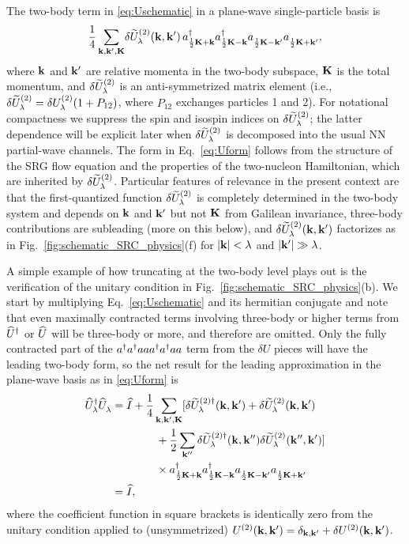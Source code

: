 \documentclass[10pt,aps,prc,floatfix,twocolumn,nofootinbib]{revtex4-1}
\begin{document}
The two-body term in \eqref{eq:Uschematic} in a plane-wave single-particle basis is
%
\begin{align} 
    \frac{1}{4} \sum_{\kvec,\kvec',\Kvec} \!  \delUtilde^{(2)}_\lambda(\kvec,\kvec') \,
    \akdag_{\frac{1}{2}\Kvec + \kvec} \akdag_{\frac{1}{2}\Kvec - \kvec} 
    \ak_{\frac{1}{2}\Kvec - \kvec'} \ak_{\frac{1}{2}\Kvec + \kvec'} 
    ,  \label{eq:Uform} 
\end{align}
%
where $\mathbf{k}$ and $\mathbf{k}'$ are relative momenta in the two-body subspace, $\mathbf{K}$ is the total momentum, and $\delta \widetilde U^{(2)}_\lambda$ is an anti-symmetrized matrix element (i.e., $\delta \widetilde U^{(2)}_\lambda = \delta U_\lambda^{(2)} (1 + P_{12})$, where $P_{12}$ exchanges particles 1 and 2). 
For notational compactness we suppress the spin and isospin indices on $\delta \widetilde U^{(2)}_\lambda$;
the latter dependence will be explicit later when $\delta \widetilde U^{(2)}_\lambda$ is decomposed into the usual NN partial-wave channels.
The form in Eq.~\eqref{eq:Uform} follows from the structure of the SRG flow equation and the properties of the two-nucleon Hamiltonian, which are inherited by $\delta \widetilde U^{(2)}_\lambda$.
Particular features of relevance in the present context are that  the first-quantized function $\delta \widetilde U^{(2)}_\lambda$ is completely determined in the two-body system and depends on $\mathbf{k}$ and $\mathbf{k}'$ but not $\mathbf{K}$ from Galilean invariance, three-body contributions are subleading (more on this below), and $\delta \widetilde U^{(2)}_\lambda(\mathbf{k},\mathbf{k}')$ factorizes as in Fig.~\ref{fig:schematic_SRC_physics}(f) for $|\mathbf{k}| < \lambda$ and $|\mathbf{k}'|\gg \lambda$.


A simple example of how truncating at the two-body level plays out is the verification of the  unitary condition in Fig.~\ref{fig:schematic_SRC_physics}(b).
We start by multiplying Eq.~\eqref{eq:Uschematic} and its hermitian conjugate and note that even maximally contracted terms involving three-body or higher terms from $\widehat U^\dagger$ or $\widehat U$ will be three-body or more, and therefore are omitted. 
Only the fully contracted part of the $a^{\dagger}a^{\dagger} a  aa^{\dagger}a^{\dagger} a a$ term from the $\delta U$ pieces will have the leading two-body form, so the net result for the leading approximation in the plane-wave basis as in \eqref{eq:Uform} is
%
\begin{align}
    \Uhatlamdag \Uhatlam &= \Ihat + \frac{1}{4}\sum_{\kvec,\kvec',\Kvec}
    [\delUtilde^{(2)\dagger}_\lambda(\kvec,\kvec') + \delUtilde^{(2)}_\lambda(\kvec,\kvec')
    \notag \\
    & \qquad\qquad \null + \frac{1}{2}\sum_{\kvec''} \delUtilde^{(2)\dagger}_\lambda(\kvec,\kvec'')\delUtilde^{(2)}_\lambda(\kvec'',\kvec') ]
    \notag \\
    & \qquad\qquad \null \times
     \akdag_{\frac{1}{2}\Kvec + \kvec} \akdag_{\frac{1}{2}\Kvec - \kvec} 
    \ak_{\frac{1}{2}\Kvec - \kvec'} \ak_{\frac{1}{2}\Kvec + \kvec'} 
    \notag \\
    &= \Ihat ,
    \label{eq:UdaggerU}
\end{align}
%
where the coefficient function in square brackets is identically zero from the unitary condition applied to (unsymmetrized) $U^{(2)}(\mathbf{k},\mathbf{k}') = \delta_{\mathbf{k},\mathbf{k}'} + \delta U^{(2)}(\mathbf{k},\mathbf{k}')$.
\end{document}
